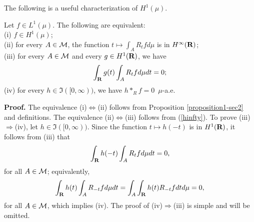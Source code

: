 The following is a useful characterization of $H^1(\mu)$.
\begin{proposition2-sec2}
Let $f\in L^1(\mu)$.  
The following are equivalent:\\
(i)  $f\in H^1(\mu)$;\\
(ii)  for every $A\in{\cal M}$, the function 
$t\mapsto \int_A R_tfd\mu$
is in $H^\infty(\R)$;\\
(iii) for every $ A\in{\cal M}$ and every $g\in H^1(\R)$,
 we have
$$\int_\R g(t)\int_A R_t f d\mu dt =0;$$
(iv)  for every $h\in \Im ([0,\infty))$, we have
$h*_Rf=0$\ $\mu$-a.e.
\label{proposition2-sec2}
\end{proposition2-sec2}
{\bf Proof.}
The equivalence (i)$\Leftrightarrow$(ii) follows from 
Proposition \ref{proposition1-sec2} and definitions.
The equivalence (ii)$\Leftrightarrow$(iii)
follows from (\ref{hinfty}).  
To prove (iii) $\Rightarrow$(iv), let $h\in \Im([0,\infty))$.
Since the function $t\mapsto h(-t)$ is in $H^1(\R)$, it
follows from (iii) that
$$\int_\R h(-t) \int_A R_t f d\mu dt=0,$$
for all $A\in {\cal M}$; equivalently,
$$\int_\R h(t) \int_A R_{-t}f d\mu dt=
\int_A\int_\R h(t) R_{-t} f dtd\mu=0,$$
for all $A\in {\cal M}$, which implies (iv).
The proof of (iv)$\Rightarrow$(iii) is simple and will be
omitted.


